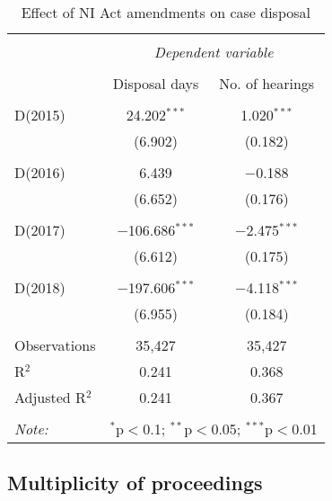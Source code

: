 \begin{table}[!ht]
  \centering
  \caption{Effect of NI Act amendments on case disposal}\label{tab:amendments_effect}
    \footnotesize
    \begin{tabular}{@{\extracolsep{5pt}}lcc}
      \\[-1.8ex] 
      \hline \\[-1.8ex] 
      & \multicolumn{2}{c}{\textit{Dependent variable}} \\ 
      \cline{2-3} 
      \\[-1.8ex] & Disposal days & No. of hearings \\ 
      \hline \\[-1.8ex] 
      D(2015) & 24.202$^{***}$ & 1.020$^{***}$ \\ 
      & (6.902) & (0.182) \\ 
      & & \\ 
      D(2016) & 6.439 & $-$0.188 \\ 
      & (6.652) & (0.176) \\ 
      & & \\ 
      D(2017) & $-$106.686$^{***}$ & $-$2.475$^{***}$ \\ 
      & (6.612) & (0.175) \\ 
      & & \\ 
      D(2018) & $-$197.606$^{***}$ & $-$4.118$^{***}$ \\ 
      & (6.955) & (0.184) \\
      \hline \\[-1.8ex] 
      Observations & 35,427 & 35,427 \\ 
      R$^{2}$ & 0.241 & 0.368 \\ 
      Adjusted R$^{2}$ & 0.241 & 0.367 \\ 
      \hline \\[-1.8ex] 
      \textit{Note:}  & \multicolumn{2}{r}{$^{*}$p$<$0.1; $^{**}$p$<$0.05; $^{***}$p$<$0.01} \\ 
    \end{tabular} 
  \end{table}
  

\subsection{Multiplicity of proceedings}
\label{sec:mult-proc}


